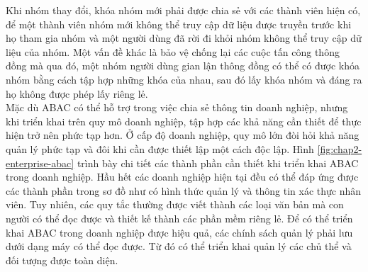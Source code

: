 Khi nhóm thay đổi, khóa nhóm mới phải được chia sẻ với các thành viên hiện có,
để một thành viên nhóm mới không thể truy cập dữ liệu được truyền trước khi họ tham
gia nhóm và một người dùng đã rời đi khỏi nhóm không thể truy cập dữ liệu của nhóm.
Một vấn đề khác là bảo vệ chống lại các cuộc tấn công thông đồng mà qua đó, một nhóm người dùng gian lận thông đồng có thể có được khóa nhóm bằng cách tập hợp những
khóa của nhau, sau đó lấy khóa nhóm và đáng ra họ không được phép lấy riêng lẻ. \\

Mặc dù ABAC có thể hỗ trợ trong việc chia sẻ thông tin doanh nghiệp, nhưng khi
triển khai trên quy mô doanh nghiệp, tập hợp các khả năng cần thiết để thực hiện trở nên
phức tạp hơn. Ở cấp độ doanh nghiệp, quy mô lớn đòi hỏi khả năng quản lý phức tạp và
đôi khi cần được thiết lập một cách độc lập. Hình \ref{fig:chap2-enterprise-abac} trình bày chi tiết các thành phần cần thiết khi triển khai ABAC trong
doanh nghiệp. Hầu hết các doanh nghiệp hiện tại đều có thể đáp ứng được các thành
phần trong sơ đồ như có hình thức quản lý và thông tin xác thực nhân viên. Tuy nhiên,
các quy tắc thường được viết thành các loại văn bản mà con người có thể đọc được và
thiết kế thành các phần mềm riêng lẻ. Để có thể triển khai ABAC trong doanh nghiệp
được hiệu quả, các chính sách quản lý phải lưu dưới dạng máy có thể đọc được. Từ đó
có thể triển khai quản lý các chủ thể và đối tượng được toàn diện. \\
